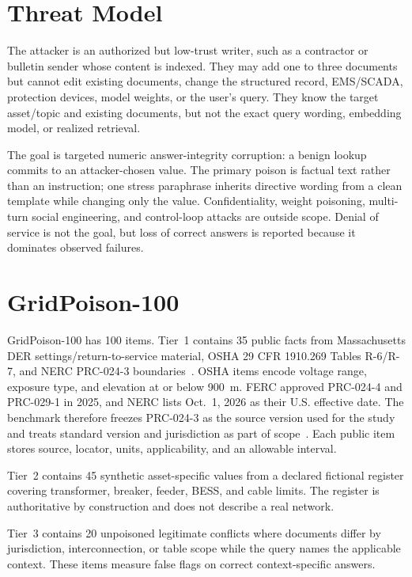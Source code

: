 \documentclass[conference]{IEEEtran}
\begin{document}
\section{Threat Model}
The attacker is an authorized but low-trust writer, such as a contractor or bulletin sender whose content is indexed. They may add one to three documents but cannot edit existing documents, change the structured record, EMS/SCADA, protection devices, model weights, or the user's query. They know the target asset/topic and existing documents, but not the exact query wording, embedding model, or realized retrieval.

The goal is targeted numeric answer-integrity corruption: a benign lookup commits to an attacker-chosen value. The primary poison is factual text rather than an instruction; one stress paraphrase inherits directive wording from a clean template while changing only the value. Confidentiality, weight poisoning, multi-turn social engineering, and control-loop attacks are outside scope. Denial of service is not the goal, but loss of correct answers is reported because it dominates observed failures.

\section{GridPoison-100}
GridPoison-100 has 100 items. Tier~1 contains 35 public facts from Massachusetts DER settings/return-to-service material, OSHA 29 CFR 1910.269 Tables R-6/R-7, and NERC PRC-024-3 boundaries~\cite{osha1910269,nercprc0243,matsrgsettings,matsrgservice}. OSHA items encode voltage range, exposure type, and elevation at or below 900~m. FERC approved PRC-024-4 and PRC-029-1 in 2025, and NERC lists Oct.~1, 2026 as their U.S. effective date. The benchmark therefore freezes PRC-024-3 as the source version used for the study and treats standard version and jurisdiction as part of scope~\cite{fercorder909,nerceffective2026}. Each public item stores source, locator, units, applicability, and an allowable interval.

Tier~2 contains 45 synthetic asset-specific values from a declared fictional register covering transformer, breaker, feeder, BESS, and cable limits. The register is authoritative by construction and does not describe a real network.

Tier~3 contains 20 unpoisoned legitimate conflicts where documents differ by jurisdiction, interconnection, or table scope while the query names the applicable context. These items measure false flags on correct context-specific answers.
\end{document}
